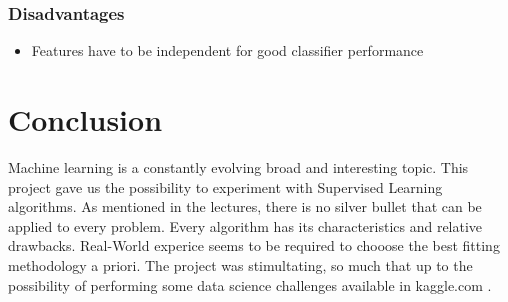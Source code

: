 \documentclass{article}
\begin{document}
\subsubsection{Disadvantages}
\begin{itemize}
	\item Features have to be independent for good classifier performance
\end{itemize}


\section{Conclusion}
Machine learning is a constantly evolving broad and interesting topic.
\break This project gave us the possibility to experiment with Supervised Learning algorithms.
As mentioned in the lectures, there is no silver bullet that can be applied to every problem. Every algorithm has its characteristics and relative drawbacks. Real-World experice seems to be required to chooose the best fitting methodology a priori.
The project was stimultating, so much that up to the possibility of performing some data science challenges available in kaggle.com .
\end{document}
